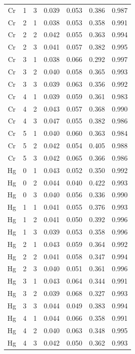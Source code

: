 \documentclass[ms, hidelinks]{uncgdissertationexp3}
\theoremstyle{plain}
\theoremstyle{definition}
\theoremstyle{remark}
\begin{document}
\begin{longtable}{ccccccc}
  Cr & 1 & 3 & 0.039 & 0.053 & 0.386 & 0.987\\
  \rowcolor{gray!6}  Cr & 2 & 1 & 0.038 & 0.053 & 0.358 & 0.991\\
  Cr & 2 & 2 & 0.042 & 0.055 & 0.363 & 0.994\\
  \rowcolor{gray!6}  Cr & 2 & 3 & 0.041 & 0.057 & 0.382 & 0.995\\
  Cr & 3 & 1 & 0.038 & 0.066 & 0.292 & 0.997\\
  \rowcolor{gray!6}  Cr & 3 & 2 & 0.040 & 0.058 & 0.365 & 0.993\\
  Cr & 3 & 3 & 0.039 & 0.063 & 0.356 & 0.992\\
  \rowcolor{gray!6}  Cr & 4 & 1 & 0.039 & 0.059 & 0.361 & 0.983\\
  Cr & 4 & 2 & 0.043 & 0.057 & 0.368 & 0.990\\
  \rowcolor{gray!6}  Cr & 4 & 3 & 0.047 & 0.055 & 0.382 & 0.986\\
  Cr & 5 & 1 & 0.040 & 0.060 & 0.363 & 0.984\\
  \rowcolor{gray!6}  Cr & 5 & 2 & 0.042 & 0.054 & 0.405 & 0.988\\
  Cr & 5 & 3 & 0.042 & 0.065 & 0.366 & 0.986\\
  \rowcolor{gray!6}  Hg & 0 & 1 & 0.043 & 0.052 & 0.350 & 0.992\\
  Hg & 0 & 2 & 0.044 & 0.040 & 0.422 & 0.993\\
  \rowcolor{gray!6}  Hg & 0 & 3 & 0.040 & 0.056 & 0.336 & 0.990\\
  Hg & 1 & 1 & 0.041 & 0.055 & 0.376 & 0.993\\
  \rowcolor{gray!6}  Hg & 1 & 2 & 0.041 & 0.050 & 0.392 & 0.996\\
  Hg & 1 & 3 & 0.039 & 0.053 & 0.358 & 0.996\\
  \rowcolor{gray!6}  Hg & 2 & 1 & 0.043 & 0.059 & 0.364 & 0.992\\
  Hg & 2 & 2 & 0.041 & 0.058 & 0.347 & 0.994\\
  \rowcolor{gray!6}  Hg & 2 & 3 & 0.040 & 0.051 & 0.361 & 0.996\\
  Hg & 3 & 1 & 0.043 & 0.064 & 0.344 & 0.991\\
  \rowcolor{gray!6}  Hg & 3 & 2 & 0.039 & 0.068 & 0.327 & 0.993\\
  Hg & 3 & 3 & 0.044 & 0.049 & 0.383 & 0.994\\
  \rowcolor{gray!6}  Hg & 4 & 1 & 0.044 & 0.066 & 0.358 & 0.991\\
  Hg & 4 & 2 & 0.040 & 0.063 & 0.348 & 0.995\\
  \rowcolor{gray!6}  Hg & 4 & 3 & 0.042 & 0.050 & 0.362 & 0.993\\

\end{longtable}
\end{document}
